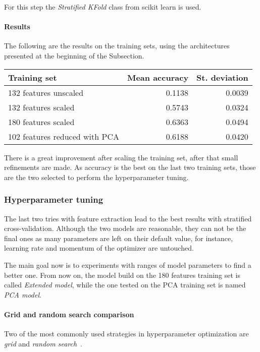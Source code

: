 For this step the \emph{Stratified KFold} class from scikit learn is used.~\cite{cross-scikit}

\paragraph{Results}
The following are the results on the training sets, using the architectures 
presented at the beginning of the Subsection.
\begin{center}
    \begin{tabular}{ |l|r|r| } 
        \hline
        Training set & Mean accuracy & St. deviation \\
        \hline
        132 features unscaled &  0.1138 & 0.0039 \\
        132 features scaled &  0.5743 & 0.0324 \\
        180 features scaled &  0.6363 & 0.0494 \\
        102 features reduced with PCA &  0.6188 & 0.0420 \\
        \hline
    \end{tabular}
\end{center}

There is a great improvement after scaling the training set, after 
that small refinements are made.
As accuracy is the best on the last two training sets, those are the two selected to 
perform the hyperparameter tuning.

\subsubsection{Hyperparameter tuning}

The last two tries with feature extraction lead to the best results 
with stratified cross-validation. Although the two models are reasonable, 
they can not be the final ones as many parameters are left on their default value, 
for instance, learning rate and momentum of the optimizer are untouched. 

The main goal now is to experiments with ranges of model parameters 
to find a better one. From now on, the model build on the 180 features training set is 
called \emph{Extended model}, 
while the one tested on the PCA training set is named \emph{PCA model}.

\paragraph{Grid and random search comparison}
Two of the most commonly used strategies in hyperparameter optimization
are \emph{grid} and \emph{random search}~\cite{random-grid}. 

